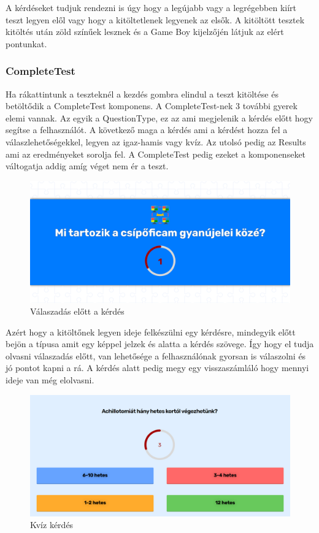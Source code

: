 A kérdéseket tudjuk rendezni is úgy hogy a legújabb vagy a legrégebben kiírt teszt legyen elől vagy hogy a kitöltetlenek legyenek az elsők.
A kitöltött tesztek kitöltés után zöld színűek lesznek és a Game Boy kijelzőjén látjuk az elért pontunkat.


\subsubsection{CompleteTest}

Ha rákattintunk a teszteknél a kezdés gombra elindul a teszt kitöltése és betöltődik a CompleteTest komponens. A CompleteTest-nek 3 további gyerek elemi vannak. Az egyik a QuestionType, ez az ami megjelenik a kérdés előtt hogy segítse a felhasználót. A következő maga a kérdés ami a kérdést hozza fel a válaszlehetőségekkel, legyen az igaz-hamis vagy kvíz. Az utolsó pedig az Results ami az eredményeket sorolja fel. A CompleteTest pedig ezeket a komponenseket váltogatja addig amíg véget nem ér a teszt.

\begin{figure}[H]
    \centering
    \includegraphics[width=\linewidth]{images/question_type.png}
    \caption{Válaszadás előtt a kérdés}
\end{figure}

Azért hogy a kitöltőnek legyen ideje felkészülni egy kérdésre, mindegyik előtt bejön a típusa amit egy képpel jelzek és alatta a kérdés szövege. Így hogy el tudja olvasni válaszadás előtt, van lehetősége a felhasználónak gyorsan is válaszolni és jó pontot kapni a rá. A kérdés alatt pedig megy egy visszaszámláló hogy mennyi ideje van még elolvasni.

\begin{figure}[H]
    \centering
    \includegraphics[width=\linewidth]{images/question1.png}
    \caption{Kvíz kérdés}
\end{figure}

